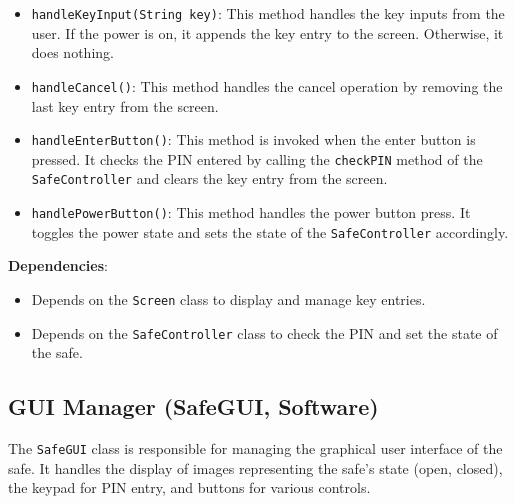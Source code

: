 \documentclass{article}
\begin{document}
\begin{itemize}
    \item \texttt{handleKeyInput(String key)}: This method handles the key inputs from the user. If the power is on, it appends the key entry to the screen. Otherwise, it does nothing.
    \item \texttt{handleCancel()}: This method handles the cancel operation by removing the last key entry from the screen.
    \item \texttt{handleEnterButton()}: This method is invoked when the enter button is pressed. It checks the PIN entered by calling the \texttt{checkPIN} method of the \texttt{SafeController} and clears the key entry from the screen.
    \item \texttt{handlePowerButton()}: This method handles the power button press. It toggles the power state and sets the state of the \texttt{SafeController} accordingly.
\end{itemize}
\textbf{Dependencies}:
\begin{itemize}
    \item Depends on the \texttt{Screen} class to display and manage key entries.
    \item Depends on the \texttt{SafeController} class to check the PIN and set the state of the safe.
\end{itemize}

\subsection{GUI Manager (SafeGUI, Software)}
The \texttt{SafeGUI} class is responsible for managing the graphical user interface of the safe. It handles the display of images representing the safe's state (open, closed), the keypad for PIN entry, and buttons for various controls.
\end{document}
